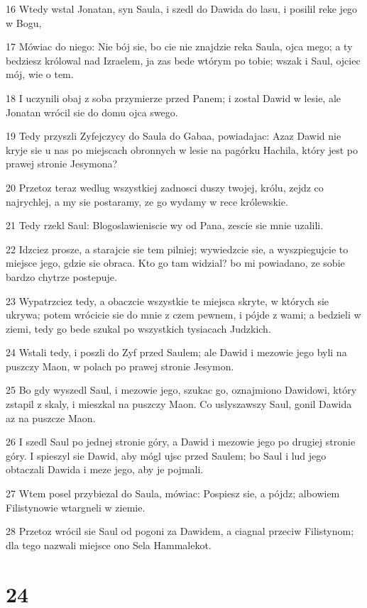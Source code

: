 \par 16 Wtedy wstal Jonatan, syn Saula, i szedl do Dawida do lasu, i posilil reke jego w Bogu,
\par 17 Mówiac do niego: Nie bój sie, bo cie nie znajdzie reka Saula, ojca mego; a ty bedziesz królowal nad Izraelem, ja zas bede wtórym po tobie; wszak i Saul, ojciec mój, wie o tem.
\par 18 I uczynili obaj z soba przymierze przed Panem; i zostal Dawid w lesie, ale Jonatan wrócil sie do domu ojca swego.
\par 19 Tedy przyszli Zyfejczycy do Saula do Gabaa, powiadajac: Azaz Dawid nie kryje sie u nas po miejscach obronnych w lesie na pagórku Hachila, który jest po prawej stronie Jesymona?
\par 20 Przetoz teraz wedlug wszystkiej zadnosci duszy twojej, królu, zejdz co najrychlej, a my sie postaramy, ze go wydamy w rece królewskie.
\par 21 Tedy rzekl Saul: Blogoslawieniscie wy od Pana, zescie sie mnie uzalili.
\par 22 Idzciez prosze, a starajcie sie tem pilniej; wywiedzcie sie, a wyszpiegujcie to miejsce jego, gdzie sie obraca. Kto go tam widzial? bo mi powiadano, ze sobie bardzo chytrze postepuje.
\par 23 Wypatrzciez tedy, a obaczcie wszystkie te miejsca skryte, w których sie ukrywa; potem wrócicie sie do mnie z czem pewnem, i pójde z wami; a bedzieli w ziemi, tedy go bede szukal po wszystkich tysiacach Judzkich.
\par 24 Wstali tedy, i poszli do Zyf przed Saulem; ale Dawid i mezowie jego byli na puszczy Maon, w polach po prawej stronie Jesymon.
\par 25 Bo gdy wyszedl Saul, i mezowie jego, szukac go, oznajmiono Dawidowi, który zstapil z skaly, i mieszkal na puszczy Maon. Co uslyszawszy Saul, gonil Dawida az na puszcze Maon.
\par 26 I szedl Saul po jednej stronie góry, a Dawid i mezowie jego po drugiej stronie góry. I spieszyl sie Dawid, aby mógl ujsc przed Saulem; bo Saul i lud jego obtaczali Dawida i meze jego, aby je pojmali.
\par 27 Wtem posel przybiezal do Saula, mówiac: Pospiesz sie, a pójdz; albowiem Filistynowie wtargneli w ziemie.
\par 28 Przetoz wrócil sie Saul od pogoni za Dawidem, a ciagnal przeciw Filistynom; dla tego nazwali miejsce ono Sela Hammalekot.

\chapter{24}

